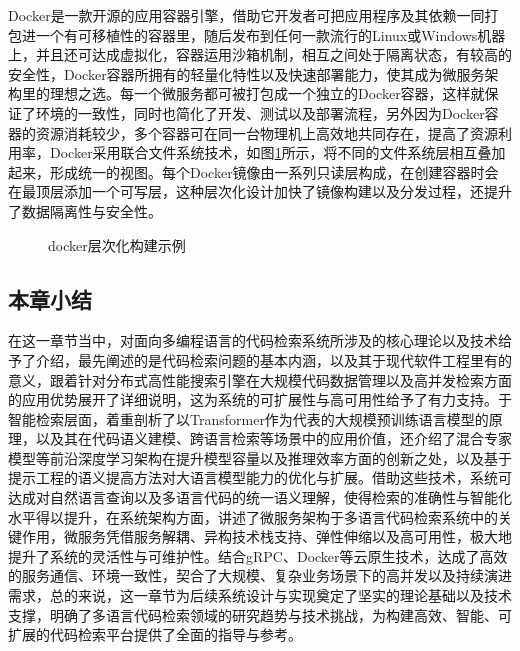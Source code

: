 \documentclass[UTF8,a4paper,12pt]{ctexart}
\numberwithin{equation}{section}
\begin{document}
Docker\cite{ref20}是一款开源的应用容器引擎，借助它开发者可把应用程序及其依赖一同打包进一个有可移植性的容器里，随后发布到任何一款流行的Linux或Windows机器上，并且还可达成虚拟化，容器运用沙箱机制，相互之间处于隔离状态，有较高的安全性，Docker容器所拥有的轻量化特性以及快速部署能力，使其成为微服务架构里的理想之选。每一个微服务都可被打包成一个独立的Docker容器，这样就保证了环境的一致性，同时也简化了开发、测试以及部署流程，另外因为Docker容器的资源消耗较少，多个容器可在同一台物理机上高效地共同存在，提高了资源利用率，Docker采用联合文件系统技术，如图\ref{docker}所示，将不同的文件系统层相互叠加起来，形成统一的视图。每个Docker镜像由一系列只读层构成，在创建容器时会在最顶层添加一个可写层，这种层次化设计加快了镜像构建以及分发过程，还提升了数据隔离性与安全性。\par
\begin{figure}[H]
	\caption{docker层次化构建示例}
	\label{docker}
\end{figure}
\subsection{本章小结}
在这一章节当中，对面向多编程语言的代码检索系统所涉及的核心理论以及技术给予了介绍，最先阐述的是代码检索问题的基本内涵，以及其于现代软件工程里有的意义，跟着针对分布式高性能搜索引擎在大规模代码数据管理以及高并发检索方面的应用优势展开了详细说明，这为系统的可扩展性与高可用性给予了有力支持。于智能检索层面，着重剖析了以Transformer作为代表的大规模预训练语言模型的原理，以及其在代码语义建模、跨语言检索等场景中的应用价值，还介绍了混合专家模型等前沿深度学习架构在提升模型容量以及推理效率方面的创新之处，以及基于提示工程的语义提高方法对大语言模型能力的优化与扩展。借助这些技术，系统可达成对自然语言查询以及多语言代码的统一语义理解，使得检索的准确性与智能化水平得以提升，在系统架构方面，讲述了微服务架构于多语言代码检索系统中的关键作用，微服务凭借服务解耦、异构技术栈支持、弹性伸缩以及高可用性，极大地提升了系统的灵活性与可维护性。结合gRPC、Docker等云原生技术，达成了高效的服务通信、环境一致性，契合了大规模、复杂业务场景下的高并发以及持续演进需求，总的来说，这一章节为后续系统设计与实现奠定了坚实的理论基础以及技术支撑，明确了多语言代码检索领域的研究趋势与技术挑战，为构建高效、智能、可扩展的代码检索平台提供了全面的指导与参考。
\newpage
{}
\end{document}
